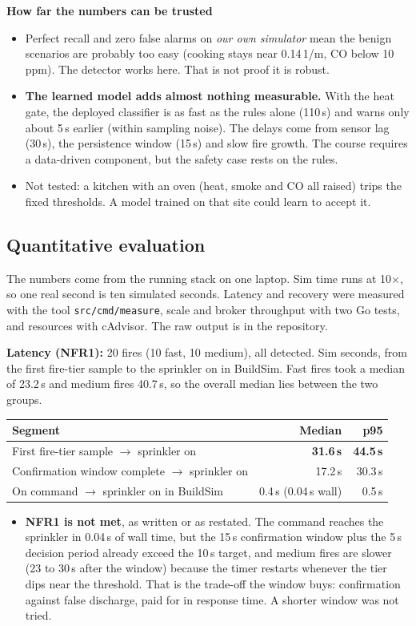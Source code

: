 \documentclass[11pt]{article}
\providecommand{\tightlist}{\setlength{\itemsep}{0pt}\setlength{\parskip}{0pt}}
\newcommand{\code}[1]{\texttt{#1}}
\begin{document}
\textbf{How far the numbers can be trusted}
\begin{itemize}\tightlist
\item Perfect recall and zero false alarms on \emph{our own simulator} mean the benign scenarios are probably too easy (cooking stays near 0.14\,1/m, CO below 10\,ppm). The detector works here. That is not proof it is robust.
\item \textbf{The learned model adds almost nothing measurable.} With the heat gate, the deployed classifier is as fast as the rules alone (110\,s) and warns only about 5\,s earlier (within sampling noise). The delays come from sensor lag (30\,s), the persistence window (15\,s) and slow fire growth. The course requires a data-driven component, but the safety case rests on the rules.
\item Not tested: a kitchen with an oven (heat, smoke and CO all raised) trips the fixed thresholds. A model trained on that site could learn to accept it.
\end{itemize}

\subsection{Quantitative evaluation}\label{sec:quant}
The numbers come from the running stack on one laptop. Sim time runs at 10$\times$, so one real second is ten simulated seconds. Latency and recovery were measured with the tool \code{src/cmd/measure}, scale and broker throughput with two Go tests, and resources with cAdvisor. The raw output is in the repository.

\textbf{Latency (NFR1):} 20 fires (10 fast, 10 medium), all detected. Sim seconds, from the first fire-tier sample to the sprinkler on in BuildSim. Fast fires took a median of 23.2\,s and medium fires 40.7\,s, so the overall median lies between the two groups.
\begin{center}
\begin{tabular}{@{}lrr@{}}
\toprule
Segment & Median & p95\\
\midrule
First fire-tier sample $\to$ sprinkler on & \textbf{31.6\,s} & \textbf{44.5\,s}\\
Confirmation window complete $\to$ sprinkler on & 17.2\,s & 30.3\,s\\
On command $\to$ sprinkler on in BuildSim & 0.4\,s (0.04\,s wall) & 0.5\,s\\
\bottomrule
\end{tabular}
\end{center}
\begin{itemize}\tightlist
\item \textbf{NFR1 is not met}, as written or as restated. The command reaches the sprinkler in 0.04\,s of wall time, but the 15\,s confirmation window plus the 5\,s decision period already exceed the 10\,s target, and medium fires are slower (23 to 30\,s after the window) because the timer restarts whenever the tier dips near the threshold. That is the trade-off the window buys: confirmation against false discharge, paid for in response time. A shorter window was not tried.
\end{itemize}
\end{document}
